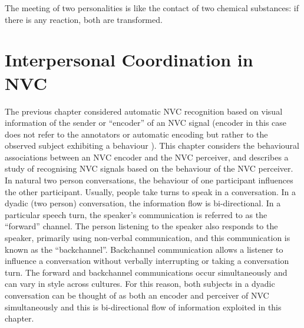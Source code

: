 
\begin{savequote}
The meeting of two personalities is like the contact of two chemical substances: if there is any reaction, both are transformed.
\end{savequote}

\chapter[Interpersonal Coordination in NVC]{Interpersonal Coordination in NVC}
\label{ChapterBackchannel}
\label{SectionBackchannelIntro}





The previous chapter considered automatic \ac{NVC} recognition based on visual information of the sender or ``encoder'' of an \ac{NVC} signal (encoder in this case does not refer to the annotators or automatic encoding but rather to the observed subject exhibiting a behaviour \cite{Lanzetta1970}). This chapter considers the behavioural associations between an \ac{NVC} encoder and the \ac{NVC} perceiver, and describes a study of recognising \ac{NVC} signals based on the behaviour of the \ac{NVC} perceiver. In natural two person conversations, the behaviour of one participant influences the other participant. 
Usually, people take turns to speak in a conversation. In a dyadic (two person) conversation, the information flow is bi-directional. In a particular speech turn, the speaker's communication is referred to as the ``forward'' channel. The person listening to the speaker also responds to the speaker, primarily using non-verbal communication, and this communication is known as the ``backchannel''. Backchannel communication allows a listener to influence a conversation without verbally interrupting or taking a conversation turn. The forward and backchannel communications occur simultaneously and can vary in style across cultures. For this reason, both subjects in a dyadic conversation can be thought of as both an encoder and perceiver of \ac{NVC} simultaneously and this is bi-directional flow of information exploited in this chapter.

